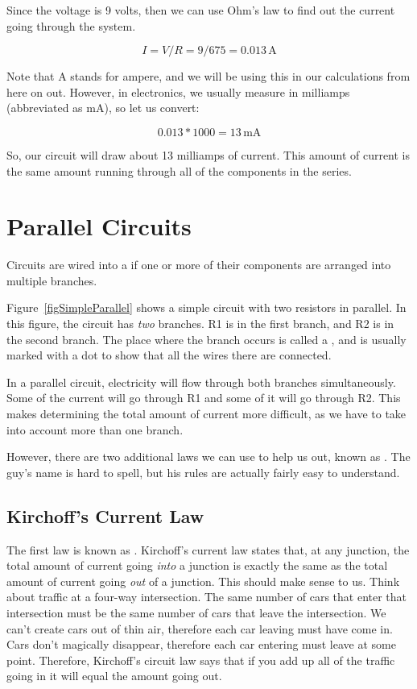 Since the voltage is 9 volts, then we can use Ohm's law to find out the current going through the system.

$$I = V / R = 9 / 675 = 0.013\,\si{\ampere}$$

Note that \si{\ampere} stands for ampere, and we will be using this in our calculations from here on out.
However, in electronics, we usually measure in milliamps (abbreviated as \si{\milli\ampere}), so let us convert:

$$ 0.013 * 1000 = 13\,\si{\milli\ampere}$$

So, our circuit will draw about 13 milliamps of current.
This amount of current is the same amount running through all of the components in the series.

\section{Parallel Circuits}

Circuits are wired into a  if one or more of their components are arranged into multiple branches.

Figure~\ref{figSimpleParallel} shows a simple circuit with two resistors in parallel.
In this figure, the circuit has \emph{two} branches.
R1 is in the first branch, and R2 is in the second branch.
The place where the branch occurs is called a , and is usually marked with a dot to show that all the wires there are connected.


In a parallel circuit, electricity will flow through both branches simultaneously.
Some of the current will go through R1 and some of it will go through R2.
This makes determining the total amount of current more difficult, as we have to take into account more than one branch.

However, there are two additional laws we can use to help us out, known as .
The guy's name is hard to spell, but his rules are actually fairly easy to understand.

\subsection{Kirchoff's Current Law}

The first law is known as .
Kirchoff's current law states that, at any junction, the total amount of current going \emph{into} a junction is exactly the same as the total amount of current going \emph{out} of a junction.
This should make sense to us.
Think about traffic at a four-way intersection.
The same number of cars that enter that intersection must be the same number of cars that leave the intersection.
We can't create cars out of thin air, therefore each car leaving must have come in.
Cars don't magically disappear, therefore each car entering must leave at some point.
Therefore, Kirchoff's circuit law says that if you add up all of the traffic going in it will equal the amount going out.

